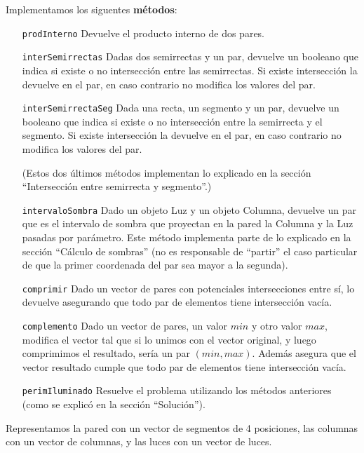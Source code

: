 Implementamos los siguentes {\bf métodos}:

\begin{itemize}
\item[\tt\small prodInterno] Devuelve el producto interno de dos pares.

\item[\tt\small interSemirrectas] Dadas dos semirrectas y un par, devuelve un
booleano que indica si existe o no intersección entre las semirrectas. Si
existe intersección la devuelve en el par, en caso contrario no modifica
los valores del par.

\item[\tt\footnotesize interSemirrectaSeg] Dada una recta, un segmento y un par, devuelve
un booleano que indica si existe o no intersección entre la semirrecta y
el segmento. Si existe intersección la devuelve en el par, en caso contrario no
modifica los valores del par.

(Estos dos últimos métodos implementan lo explicado en la sección ``Intersección
entre semirrecta y segmento''.)

\item[\tt\small intervaloSombra] Dado un objeto Luz y un objeto Columna, devuelve
un par que es el intervalo de sombra que proyectan en la pared la Columna y la Luz
pasadas por parámetro. Este método implementa parte de lo explicado en la sección
``Cálculo de sombras'' (no es responsable de ``partir'' el caso particular de
que la primer coordenada del par sea mayor a la segunda).

\item[\tt\small comprimir] Dado un vector de pares con potenciales
intersecciones entre sí, lo devuelve asegurando que todo par de elementos tiene
intersección vacía.

\item[\tt\small complemento] Dado un vector de pares, un valor $min$ y otro
valor $max$, modifica el vector tal que si lo unimos con el vector original,
y luego comprimimos el resultado, sería un par $(min,max)$. Además asegura
que el vector resultado cumple que todo par de elementos tiene intersección
vacía.

\item[\tt\small perimIluminado] Resuelve el problema utilizando los métodos
anteriores (como se explicó en la sección ``Solución'').

\end{itemize}

Representamos la pared con un vector de segmentos de 4 posiciones, las columnas
con un vector de columnas, y las luces con un vector de luces.


